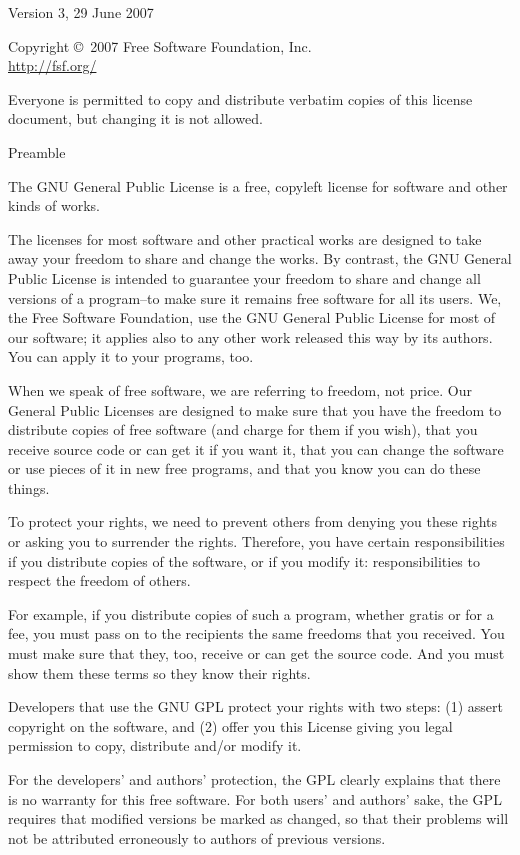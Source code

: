 Version 3, 29 June 2007

Copyright \copyright\ 2007 Free Software Foundation, Inc. \\
\url{http://fsf.org/}

Everyone is permitted to copy and distribute verbatim copies
of this license document, but changing it is not allowed.

\begin{center}
  \Large Preamble
\end{center}

The GNU General Public License is a free, copyleft license for
software and other kinds of works.

The licenses for most software and other practical works are designed
to take away your freedom to share and change the works.  By contrast,
the GNU General Public License is intended to guarantee your freedom to
share and change all versions of a program--to make sure it remains free
software for all its users.  We, the Free Software Foundation, use the
GNU General Public License for most of our software; it applies also to
any other work released this way by its authors.  You can apply it to
your programs, too.

When we speak of free software, we are referring to freedom, not
price.  Our General Public Licenses are designed to make sure that you
have the freedom to distribute copies of free software (and charge for
them if you wish), that you receive source code or can get it if you
want it, that you can change the software or use pieces of it in new
free programs, and that you know you can do these things.

To protect your rights, we need to prevent others from denying you
these rights or asking you to surrender the rights.  Therefore, you have
certain responsibilities if you distribute copies of the software, or if
you modify it: responsibilities to respect the freedom of others.

For example, if you distribute copies of such a program, whether
gratis or for a fee, you must pass on to the recipients the same
freedoms that you received.  You must make sure that they, too, receive
or can get the source code.  And you must show them these terms so they
know their rights.

Developers that use the GNU GPL protect your rights with two steps:
(1) assert copyright on the software, and (2) offer you this License
giving you legal permission to copy, distribute and/or modify it.

For the developers' and authors' protection, the GPL clearly explains
that there is no warranty for this free software.  For both users' and
authors' sake, the GPL requires that modified versions be marked as
changed, so that their problems will not be attributed erroneously to
authors of previous versions.

